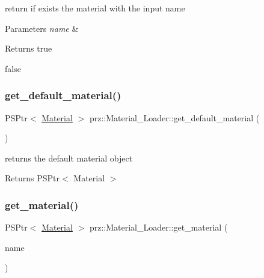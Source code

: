 return if exists the material with the input name 


\begin{DoxyParams}{Parameters}
{\em name} & \\
\hline
\end{DoxyParams}
\begin{DoxyReturn}{Returns}
true 

false 
\end{DoxyReturn}
\mbox{\label{classprz_1_1_material___loader_a819c44607837169bbaa41d625902bef6}} 
\subsubsection{\texorpdfstring{get\_default\_material()}{get\_default\_material()}}
{\footnotesize\ttfamily P\+S\+Ptr$<$ \mbox{\hyperlink{classprz_1_1_material}{Material}} $>$ prz\+::\+Material\+\_\+\+Loader\+::get\+\_\+default\+\_\+material (\begin{DoxyParamCaption}{ }\end{DoxyParamCaption})\hspace{0.3cm}{\ttfamily [inline]}}



returns the default material object 

\begin{DoxyReturn}{Returns}
P\+S\+Ptr$<$ Material $>$ 
\end{DoxyReturn}
\mbox{\label{classprz_1_1_material___loader_a2eb8615a2067fed29e1d3425c9c79318}} 
\subsubsection{\texorpdfstring{get\_material()}{get\_material()}}
{\footnotesize\ttfamily P\+S\+Ptr$<$ \mbox{\hyperlink{classprz_1_1_material}{Material}} $>$ prz\+::\+Material\+\_\+\+Loader\+::get\+\_\+material (\begin{DoxyParamCaption}\item[{const P\+String \&}]{name }\end{DoxyParamCaption})}



